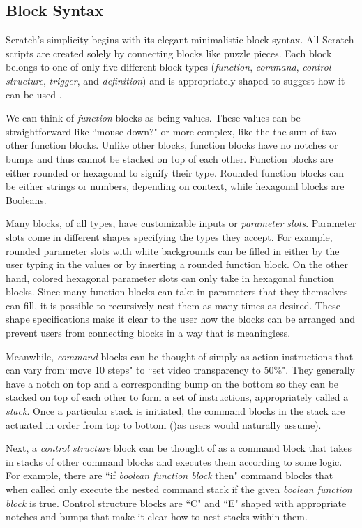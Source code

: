 \subsection{Block Syntax}

Scratch's simplicity begins with its elegant minimalistic block syntax. All Scratch scripts are created solely by connecting blocks like puzzle pieces. Each block belongs to one of only five different block types (\emph{function}, \emph{command}, \emph{control structure}, \emph{trigger}, and \emph{definition}) and is appropriately shaped to suggest how it can be used \cite{Maloney}.

We can think of \emph{function} blocks as being values. These values can be straightforward like ``mouse down?" or more complex, like the the sum of two other function blocks. Unlike other blocks, function blocks have no notches or bumps and thus cannot be stacked on top of each other. Function blocks are either rounded or hexagonal to signify their type. Rounded function blocks can be either strings or numbers, depending on context, while hexagonal blocks are Booleans. 

Many blocks, of all types, have customizable inputs or \emph{parameter slots}. Parameter slots come in different shapes specifying the types they accept. For example, rounded parameter slots with white backgrounds can be filled in either by the user typing in the values or by inserting a rounded function block. On the other hand, colored hexagonal parameter slots can only take in hexagonal function blocks. Since many function blocks can take in parameters that they themselves can fill, it is possible to recursively nest them as many times as desired. These shape specifications make it clear to the user how the blocks can be arranged and prevent users from connecting blocks in a way that is meaningless.

Meanwhile, \emph{command} blocks can be thought of simply as action instructions that can vary from``move 10 steps" to ``set video transparency to 50\%". They generally have a notch on top and a corresponding bump on the bottom so they can be stacked on top of each other to form a set of instructions, appropriately called a \emph{stack}. Once a particular stack is initiated, the command blocks in the stack are actuated in order from top to bottom ()as users would naturally assume).  

Next, a \emph{control structure} block can be thought of as a command block that takes in stacks of other command blocks and executes them according to some logic. For example, there are ``if \emph{boolean function block} then" command blocks that when called only execute the nested command stack if the given \emph{boolean function block} is true. Control structure blocks are ``C" and ``E" shaped with appropriate notches and bumps that make it clear how to nest stacks within them.

